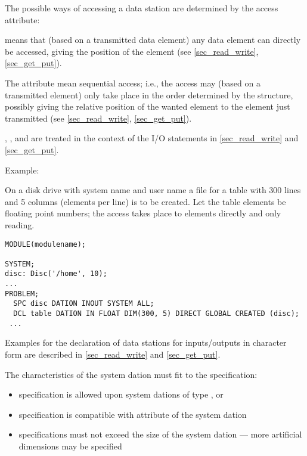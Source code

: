 The possible ways of accessing a data station are determined by the
access attribute:

\begin{grammarframe}

\end{grammarframe}

 
means that (based on a transmitted data element) any data element
can directly be accessed, giving the position of the element
(see \ref{sec_read_write}, \ref{sec_get_put}).

The attribute  
 mean sequential access; i.e., the
access may (based on a transmitted element) only take place in the order
determined by the structure,
possibly giving the relative position of the wanted
element to the element just transmitted 
(see \ref{sec_read_write}, \ref{sec_get_put}).


 , ,
  and 
 are treated in the context of the
I/O statements in 
\ref{sec_read_write} and \ref{sec_get_put}.

Example:

On a disk drive with system name 
 and user name  a file for a
table with 300 lines and 5 columns (elements per line) is to be created.
Let the table elements be floating point numbers; the access takes place
to elements directly and only reading.

\begin{lstlisting}
MODULE(modulename);

SYSTEM;
disc: Disc('/home', 10);
... 
PROBLEM;
  SPC disc DATION INOUT SYSTEM ALL;
  DCL table DATION IN FLOAT DIM(300, 5) DIRECT GLOBAL CREATED (disc);
 ...
\end{lstlisting}

Examples for the declaration of data stations for inputs/outputs in
character form are described in 
\ref{sec_read_write} and \ref{sec_get_put}.

The characteristics of the system dation must fit to the specification:
\begin{itemize}
\item {} specification is allowed upon system dations of type ,
    or 
\item {} specification is compatible with  attribute
   of the system dation
\item {} specifications must not exceed the size of the system dation ---
      more artificial dimensions may be specified
\end{itemize}

